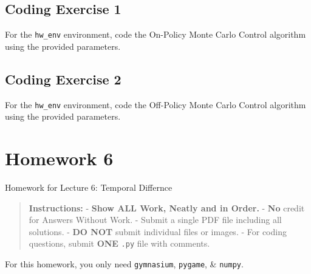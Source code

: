 \documentclass[
  letterpaper,
  DIV=11,
  numbers=noendperiod]{scrreprt}
\makeatletter
\newcommand*\pandocbounded[1]{%
  \sbox\pandoc@box{#1}%
  \Gscale@div\@tempa{\textheight}{\dimexpr\ht\pandoc@box+\dp\pandoc@box\relax}%
  \Gscale@div\@tempb{\linewidth}{\wd\pandoc@box}%
  \ifdim\@tempb\p@<\@tempa\p@\let\@tempa\@tempb\fi%
  \ifdim\@tempa\p@<\p@\scalebox{\@tempa}{\usebox\pandoc@box}%
  \else\usebox{\pandoc@box}%
  \fi%
}
\makeatother
\begin{document}
\section{Coding Exercise 1}\label{coding-exercise-1-2}

For the \texttt{hw\_env} environment, code the On-Policy Monte Carlo
Control algorithm using the provided parameters.

\section{Coding Exercise 2}\label{coding-exercise-2-1}

For the \texttt{hw\_env} environment, code the Off-Policy Monte Carlo
Control algorithm using the provided parameters.

\section{\texorpdfstring{\href{https://colab.research.google.com/drive/1Y_A4uKoSmjc6EmU-Or7tbeo3fe_ZD4RH?usp=sharing}{\protect\pandocbounded{}}}{}}\label{section-3}

\chapter{Homework 6}\label{homework-6}

\begin{tcolorbox}[enhanced jigsaw, arc=.35mm, toprule=.15mm, leftrule=.75mm, colback=white, left=2mm, colframe=quarto-callout-note-color-frame, rightrule=.15mm, opacityback=0, breakable, bottomrule=.15mm]

Homework for Lecture 6: Temporal Differnce 📝

\end{tcolorbox}

\begin{quote}
\textbf{Instructions:} - \textbf{Show ALL Work, Neatly and in Order.} -
\textbf{No} credit for Answers Without Work. - Submit a single PDF file
including all solutions. - \textbf{DO NOT} submit individual files or
images. - For coding questions, submit \textbf{ONE} \texttt{.py} file
with comments.
\end{quote}

\begin{tcolorbox}[enhanced jigsaw, toprule=.15mm, leftrule=.75mm, coltitle=black, left=2mm, opacityback=0, titlerule=0mm, arc=.35mm, toptitle=1mm, opacitybacktitle=0.6, bottomtitle=1mm, colframe=quarto-callout-note-color-frame, title=\textcolor{quarto-callout-note-color}{\faInfo}\hspace{0.5em}{Note}, rightrule=.15mm, bottomrule=.15mm, colbacktitle=quarto-callout-note-color!10!white, breakable, colback=white]

For this homework, you only need \texttt{gymnasium}, \texttt{pygame}, \&
\texttt{numpy}.

\end{tcolorbox}
\end{document}
